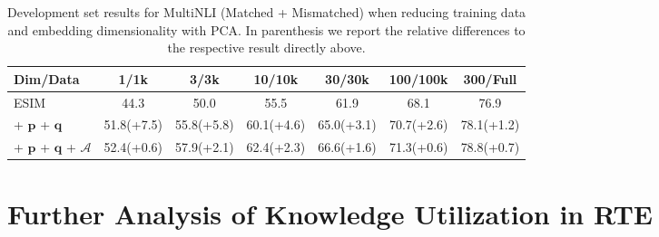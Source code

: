 \documentclass[11pt,a4paper]{article}
\begin{document}
\begin{table}[t]
    \small
    \centering
        \begin{tabular}{l c c c c c c}
            \toprule
            Dim/Data & 1/1k & 3/3k & 10/10k & 30/30k & 100/100k & 300/Full \\ 
            \midrule
            ESIM & 44.3 & 50.0 & 55.5 & 61.9 & 68.1 & 76.9 \\
            + $\boldsymbol{p}$ + $\boldsymbol{q}$ & 51.8(+7.5) & 55.8(+5.8) & 60.1(+4.6) & 65.0(+3.1) & 70.7(+2.6) & 78.1(+1.2) \\
            + $\boldsymbol{p}$ + $\boldsymbol{q}$ + $\mathcal{A}$ & 52.4(+0.6) & 57.9(+2.1) & 62.4(+2.3) & 66.6(+1.6) & 71.3(+0.6) & 78.8(+0.7) \\
            \bottomrule
        \end{tabular}    
        \caption{Development set results for MultiNLI (Matched + Mismatched) when reducing training data and embedding dimensionality with PCA. In parenthesis we report the relative differences to the respective result directly above.}\label{tab:data_reduction}
\end{table}


\section{Further Analysis of Knowledge Utilization in RTE}
\label{sec:additional_analysis}
\end{document}
